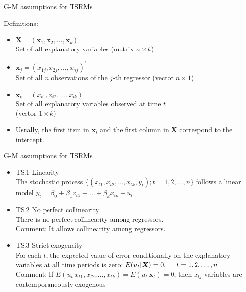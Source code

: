 \documentclass{beamer}
\begin{document}
\begin{frame}{G-M assumptions for TSRMs}

Definitions:
	\begin{itemize}
	\medskip
	\item $\boldsymbol{X}=(\boldsymbol{x}_{1},
    \boldsymbol{x}_{2},\dots,
    \boldsymbol{x}_{k})$\\Set of all explanatory variables (matrix $n \times k$) 
    \item $\bm{x}_j = (x_{1j}, x_{2j}, \dots , x_{nj})^{\prime}$\\
    Set of all $n$ observations of the $j$-th regressor (vector $n \times 1$)
	\item $\boldsymbol{x}_t=(x_{t1},x_{t2}, \dots, x_{tk})$\\
	Set of all explanatory variables observed at time $t$ \\ 
    (vector $ 1 \times k$)
    \medskip
    \item Usually, the first item in $\boldsymbol{x}_t$ and the first column in $\boldsymbol{X}$ correspond to the intercept.
    \end{itemize}
\end{frame}


\begin{frame}{G-M assumptions for TSRMs}
\begin{itemize}
\item TS.1 Linearity \\ 
The stochastic process $\{(x_{t1},x_{t2},\dots,x_{tk},y_t);t=1,2,\dots, n \}$ 
follows a linear model $ y_t = \beta_0 + \beta_1 x_{t1} + \dots + \beta_k x_{tk}+u_t$.
\vspace{0.5cm}
\item TS.2 No perfect collinearity \\
There is no perfect collinearity among regressors. \\
{\footnotesize Comment: It allows collinearity among regressors.}
\vspace{0.5cm}
\item TS.3 Strict exogeneity \\ 
For each $t$, the expected value of error conditionally on the explanatory variables at all time periods is zero: $ E(u_t|\boldsymbol{X})=0, \hspace{0.5cm} t = 1,2,\dots,n$ \\
    {\footnotesize Comment: If $E(u_t|x_{t1},x_{t2},\dots,x_{tk})=E(u_t|\boldsymbol{x}_t)=0$, then $x_{tj}$ variables are contemporaneously exogenous}  
\end{itemize}
\end{frame}
\end{document}

